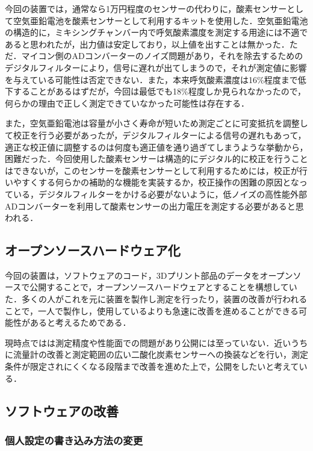 今回の装置では，通常なら1万円程度のセンサーの代わりに，酸素センサーとして空気亜鉛電池を酸素センサーとして利用するキットを使用した．空気亜鉛電池の構造的に，ミキシングチャンバー内で呼気酸素濃度を測定する用途には不適であると思われたが，出力値は安定しており，以上値を出すことは無かった．ただ．マイコン側のADコンバーターのノイズ問題があり，それを除去するためのデジタルフィルターにより，信号に遅れが出てしまうので，それが測定値に影響を与えている可能性は否定できない．また，本来呼気酸素濃度は16\%程度まで低下することがあるはずだが，今回は最低でも18\%程度しか見られなかったので，何らかの理由で正しく測定できていなかった可能性は存在する．

また，空気亜鉛電池は容量が小さく寿命が短いため測定ごとに可変抵抗を調整して校正を行う必要があったが，デジタルフィルターによる信号の遅れもあって，適正な校正値に調整するのは何度も適正値を通り過ぎてしまうような挙動から，困難だった．今回使用した酸素センサーは構造的にデジタル的に校正を行うことはできないが，このセンサーを酸素センサーとして利用するためには，校正が行いやすくする何らかの補助的な機能を実装するか，校正操作の困難の原因となっている，デジタルフィルターをかける必要がないように，低ノイズの高性能外部ADコンバーターを利用して酸素センサーの出力電圧を測定する必要があると思われる．

\subsection{オープンソースハードウェア化}

今回の装置は，ソフトウェアのコード，3Dプリント部品のデータをオープンソースで公開することで，オープンソースハードウェアとすることを構想していた．多くの人がこれを元に装置を製作し測定を行ったり，装置の改善が行われることで，一人で製作し，使用しているよりも急速に改善を進めることができる可能性があると考えるためである．

現時点ではは測定精度や性能面での問題があり公開には至っていない．近いうちに流量計の改善と測定範囲の広い二酸化炭素センサーへの換装などを行い，測定条件が限定されにくくなる段階まで改善を進めた上で，公開をしたいと考えている．

\subsection{ソフトウェアの改善}

\subsubsection{個人設定の書き込み方法の変更}

